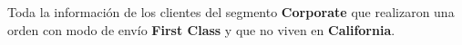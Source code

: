 Toda la información de los clientes del segmento \textbf{Corporate} que realizaron una orden con modo de envío \textbf{First Class}
y que no viven en \textbf{California}.
